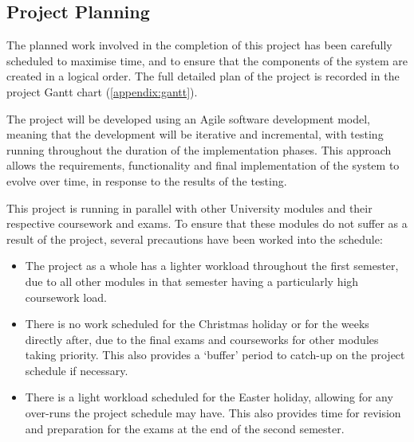 \documentclass[12pt,a4paper]{article}
\begin{document}
\subsection{Project Planning}

The planned work involved in the completion of this project has been carefully scheduled to maximise time, and to ensure that the components of the system are created in a logical order. The full detailed plan of the project is recorded in the project Gantt chart (\autoref{appendix:gantt}).

The project will be developed using an Agile software development model, meaning that the development will be iterative and incremental, with testing running throughout the duration of the implementation phases. This approach allows the requirements, functionality and final implementation of the system to evolve over time, in response to the results of the testing.

This project is running in parallel with other University modules and their respective coursework and exams. To ensure that these modules do not suffer as a result of the project, several precautions have been worked into the schedule:
\begin{itemize}
    \item The project as a whole has a lighter workload throughout the first semester, due to all other modules in that semester having a particularly high coursework load.
    \item There is no work scheduled for the Christmas holiday or for the weeks directly after, due to the final exams and courseworks for other modules taking priority. This also provides a `buffer' period to catch-up on the project schedule if necessary.
    \item There is a light workload scheduled for the Easter holiday, allowing for any over-runs the project schedule may have. This also provides time for revision and preparation for the exams at the end of the second semester.
\end{itemize}

\pagebreak
\end{document}
